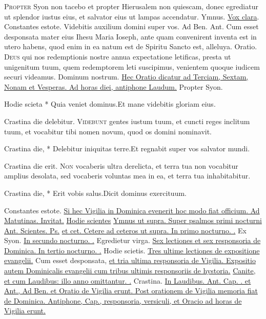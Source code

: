 \begin{multicols*}{2}
\lettrine[lines=2]{\zallmancaps \color{Blue} P}{ropter} Syon non tacebo et propter Hierusalem non quiescam, donec egrediatur ut splendor iustus eius, et salvator eius ut lampas accendatur. {\color{Red} Ymnus.} \hyperlink{vox-clara}{Vox clara}. \V Constantes estote. \R Videbitis auxilium domini super vos. {\color{Red} Ad Ben. Ant.} Cum esset desponsata mater eius Ihesu Maria Ioseph, ante quam convenirent inventa est in utero habens, quod enim in ea natum est de Spiritu Sancto est, alleluya. {\color{Red} Oratio.}
\lettrine[lines=2]{\zallmancaps \color{Red} D}{eus} \hypertarget{oratio-nativitatis-domini}{qui} nos redemptionis nostre annua expectatione letificas, presta ut unigenitum tuum, quem redemptorem leti suscipimus, venientem quoque iudicem securi videamus. Dominum nostrum.
\newline \ul{Hec Oratio dicatur ad Terciam, Sextam, Nonam et Vesperas. Ad horas diei, antiphone Laudum.}
 Propter Syon.
\begin{responsory-breve}
{Hodie scieta * Quia veniet dominus.}{Et mane videbitis gloriam eius.}
\end{responsory-breve}
\V Crastina die delebitur.
\lettrine[lines=2]{\zallmancaps \color{Blue} V}{idebunt} gentes iustum tuum, et cuncti reges inclitum tuum, et vocabitur tibi nomen novum, quod os domini nominavit.
\begin{responsory-breve}
{Crastina die, * Delebitur iniquitas terre.}{Et regnabit super vos salvator mundi.}
\end{responsory-breve}
\V Crastina die erit.
\lettrine[lines=2]{\zallmancaps \color{Red} N}{on} vocaberis ultra derelicta, et terra tua non vocabitur amplius desolata, sed vocaberis voluntas mea in ea, et terra tua inhabitabitur.
\begin{responsory-breve}
{Crastina die, * Erit vobis salus.}{Dicit dominus exercituum.}
\end{responsory-breve}
\V Constantes estote.
\newline \ul{Si hec Vigilia in Dominica evenerit hoc modo fiat officium. Ad Matutinas. Invitat.} \hyperlink{hodie-scietis}{Hodie scientes} \ul{Ymnus ut supra. Super psalmos primi nocturni Ant. Scientes. Ps.}  \ul{et cet. Cetere ad ceteros ut supra. In primo nocturno. \Vbar .} Ex Syon. \ul{In secundo nocturno. \Vbar .} Egredietur virga. \ul{Sex lectiones et sex responsoria de Dominica. In tertio nocturno. \Vbar .} Hodie scietis. \ul{Tres ultime lectiones de expositione evangelii.} Cum esset desponsata, \ul{et tria ultima responsoria de Vigilia. Expositio autem Dominicalis evangelii cum tribus ultimis responsoriis de hystoria.} \hyperlink{canite-tuba}{Canite,} \ul{et cum Laudibus: illo anno omittantur. \Vbar .} Crastina. \ul{In Laudibus. Ant. Cap. \Vbar . et Ant., Ad Ben. et Oratio de Vigilia erunt. Post orationem de Vigilia memoria fiat de Dominica. Antiphone, Cap., responsoria, versiculi, et Oracio ad horas de Vigilia erunt.}

\end{multicols*}
